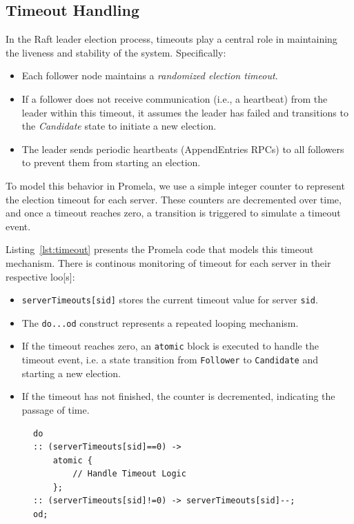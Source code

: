 \documentclass[a4paper]{llncs}
\begin{document}
   \subsection{Timeout Handling}
   \label{sec:timeout_handling}

In the Raft leader election process, timeouts play a central role in maintaining the liveness and stability of the system. Specifically:
\begin{itemize}
    \item Each follower node maintains a \textit{randomized election timeout}.
    \item If a follower does not receive communication (i.e., a heartbeat) from the leader within this timeout, it assumes the leader has failed and transitions to the \textit{Candidate} state to initiate a new election.
    \item The leader sends periodic heartbeats (AppendEntries RPCs) to all followers to prevent them from starting an election.
\end{itemize}

To model this behavior in Promela, we use a simple integer counter to represent the election timeout for each server. These counters are decremented over time, and once a timeout reaches zero, a transition is triggered to simulate a timeout event.

Listing~\ref{lst:timeout} presents the Promela code that models this timeout mechanism. There is continous monitoring of timeout for each server in their respective loo[s]:

\begin{itemize}
    \item \texttt{serverTimeouts[sid]} stores the current timeout value for server \texttt{sid}.
    \item The \texttt{do...od} construct represents a repeated looping mechanism.
    \item If the timeout reaches zero, an \texttt{atomic} block is executed to handle the timeout event, i.e. a state transition from \texttt{Follower} to \texttt{Candidate} and starting a new election.
    \item If the timeout has not finished, the counter is decremented, indicating the passage of time.
\end{itemize}


\begin{figure}[htbp]
    \centering
    \begin{lstlisting}[style=promela, caption={Timeout handling in Raft using Promela}, label={lst:timeout}]
do
:: (serverTimeouts[sid]==0) ->
    atomic {
        // Handle Timeout Logic
    };
:: (serverTimeouts[sid]!=0) -> serverTimeouts[sid]--;
od;
    \end{lstlisting}
\end{figure}
\end{document}
